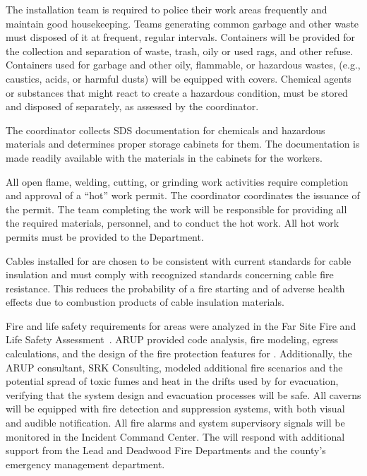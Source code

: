The  installation team is required to police their work areas
frequently and maintain good housekeeping. Teams generating common garbage and other
waste must disposed of it at frequent, regular intervals. %
Containers will be provided for the
collection and separation of waste, trash, oily or used rags, and other
refuse.  Containers used for garbage and other oily, flammable, or
hazardous wastes, (e.g., caustics, acids, or harmful dusts) will be equipped with covers.  Chemical agents or
substances that might react to create a hazardous condition, must
be stored and disposed of separately, as assessed by the
  coordinator.

The   coordinator collects SDS documentation for chemicals and hazardous materials and determines proper storage cabinets for them.  The documentation is made readily available with the materials in the cabinets for the workers. 



All open flame, welding, cutting, or grinding work activities require completion and approval of a  ``hot'' work permit.  The 
 coordinator coordinates the issuance of the permit.
The team completing the work will be responsible for
providing all the required materials, personnel, and  %
to conduct the hot work. All hot work permits must be
provided to the   Department.

Cables installed for  are chosen to be
consistent with current \fnal standards for cable insulation and must
comply with recognized standards concerning cable fire resistance. 
This reduces the probability of a fire starting and of adverse health effects due to
combustion products of cable insulation materials.

Fire and life safety requirements for  areas were
analyzed in the  Far Site Fire and Life Safety
  Assessment~. ARUP provided code analysis, fire
modeling, egress calculations, and the design of the fire protection
features for  .  Additionally, the ARUP
consultant, SRK Consulting, modeled additional fire scenarios and the potential
spread of toxic fumes and heat in the drifts used by
 for evacuation, verifying that the system design and evacuation 
    processes will be safe.   All caverns will be equipped with
fire detection and suppression systems, with both visual and audible
notification.  All fire alarms and system supervisory signals will be
monitored in the  Incident Command Center.  The
  will respond with additional support from the
Lead and Deadwood Fire Departments and the county’s emergency management
department.

